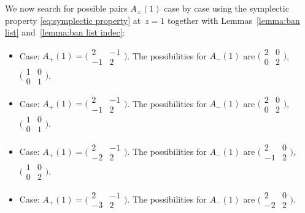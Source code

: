 \documentclass[10pt,a4paper]{amsart}
\numberwithin{equation}{section}
\theoremstyle{definition}
\begin{document}
We now search for possible pairs $A_\pm(1)$ case by case using the symplectic property
\eqref{eq:symplectic property} at~${z = 1}$ together with Lemmas~\ref{lemma:ban list} and~\ref{lemma:ban list indec}:
\begin{itemize}\itemsep=0pt
\item Case:
 $A_+(1) =
 \bigl(\begin{smallmatrix}
 2 & -1 \\
 -1 & 2
\end{smallmatrix}\bigr)$.
 The possibilities for $A_-(1)$ are
$\bigl(\begin{smallmatrix}
 2 & 0 \\
 0 & 2
\end{smallmatrix}\bigr)$,
$\bigl(\begin{smallmatrix}
 1 & 0 \\
 0 & 1
\end{smallmatrix}\bigr)$.

\item Case:
$A_+(1) =
\bigl(\begin{smallmatrix}
 2 & -1 \\
 -1 & 2
\end{smallmatrix}\bigr)$.
 The possibilities for $A_-(1)$ are $\bigl(\begin{smallmatrix}
 2 & 0 \\
 0 & 2
\end{smallmatrix}\bigr)$, $\bigl(\begin{smallmatrix}
 1 & 0 \\
 0 & 1
\end{smallmatrix}\bigr)$.

\item Case:
$A_+(1) =
\bigl(\begin{smallmatrix}
 2 & -1 \\
 -2 & 2
\end{smallmatrix}\bigr)$.
 The possibilities for $A_-(1)$ are
$\bigl(\begin{smallmatrix}
 2 & 0 \\
 -1 & 2
\end{smallmatrix}\bigr)$, $\bigl(\begin{smallmatrix}
 1 & 0 \\
 0 & 2
\end{smallmatrix}\bigr)$.

\item Case: $A_+(1) =
\bigl(\begin{smallmatrix}
 2 & -1 \\
 -3 & 2
\end{smallmatrix}\bigr)$.
 The possibilities for $A_-(1)$ are $\bigl(\begin{smallmatrix}
 2 & 0 \\
 -2 & 2
\end{smallmatrix}\bigr)$.


\end{itemize}
\end{document}
